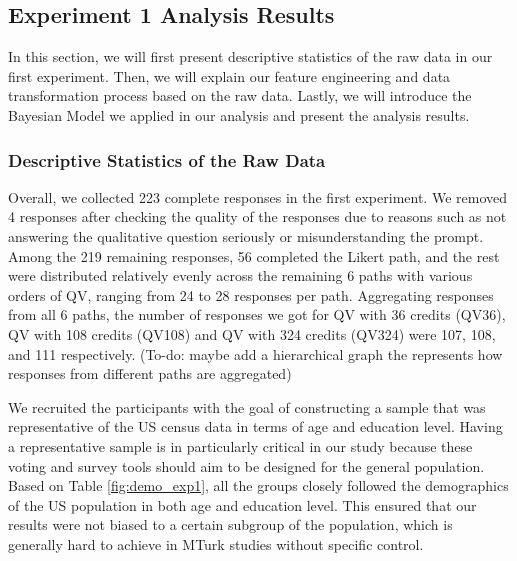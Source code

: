 \subsection{Experiment 1 Analysis Results} \label{results-1-quan}
In this section, we will first present descriptive statistics of the raw data in our first experiment. Then, we will explain our feature engineering and data transformation process based on the raw data. Lastly, we will introduce the Bayesian Model we applied in our analysis and present the analysis results.

\subsubsection{Descriptive Statistics of the Raw Data}
    
Overall, we collected 223 complete responses in the first experiment. We removed 4 responses after checking the quality of the responses due to reasons such as not answering the qualitative question seriously or misunderstanding the prompt. Among the 219 remaining responses, 56 completed the Likert path, and the rest were distributed relatively evenly across the remaining 6 paths with various orders of QV, ranging from 24 to 28 responses per path. Aggregating responses from all 6 paths, the number of responses we got for QV with 36 credits (QV36), QV with 108 credits (QV108) and QV with 324 credits (QV324) were 107, 108, and 111 respectively. (To-do: maybe add a hierarchical graph the represents how responses from different paths are aggregated)

We recruited the participants with the goal of constructing a sample that was representative of the US census data in terms of age and education level. Having a representative sample is in particularly critical in our study because these voting and survey tools should aim to be designed for the general population. Based on Table \ref{fig:demo_exp1}, all the groups closely followed the demographics of the US population in both age and education level. This ensured that our results were not biased to a certain subgroup of the population, which is generally hard to achieve in MTurk studies without specific control. 



